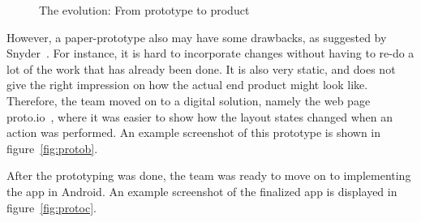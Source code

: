 \begin{figure}[H]
  \centering
\quad
\quad
\caption{The evolution: From prototype to product}
\end{figure}

\noindent However, a paper-prototype also may have some drawbacks, as suggested by Snyder~\cite{paperprototype}. For instance, it is hard to incorporate changes without having to re-do a lot of the work that has already been done. It is also very static, and does not give the right impression on how the actual end product might look like. Therefore, the team moved on to a digital solution, namely the web page proto.io~\cite{protoio}, where it was easier to show how the layout states changed when an action was performed. An example screenshot of this prototype is shown in figure~\ref{fig:protob}.

After the prototyping was done, the team was ready to move on to implementing the app in Android. An example screenshot of the finalized app is displayed in figure~\ref{fig:protoc}.
